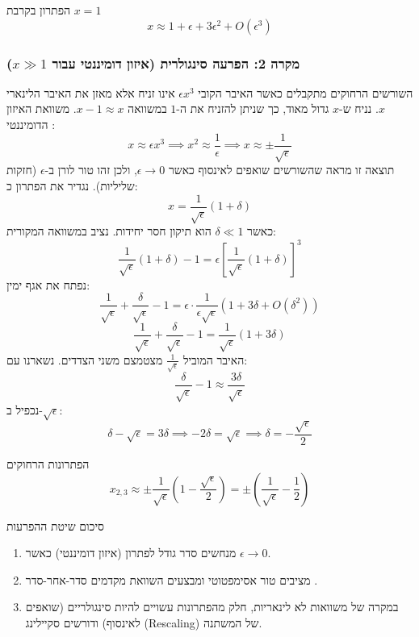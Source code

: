 \begin{resultbox}{הפתרון בקרבת $x=1$}
\[
x \approx 1 + \epsilon + 3\epsilon^2 + O(\epsilon^3)
\]
\end{resultbox}

\subsubsection{מקרה 2: הפרעה סינגולרית (איזון דומיננטי עבור $x \gg 1$)}
השורשים הרחוקים מתקבלים כאשר האיבר הקובי $\epsilon x^3$ אינו זניח אלא מאזן את האיבר הלינארי $x$.
נניח ש-$x$ גדול מאוד, כך שניתן להזניח את ה-$1$ במשוואה $x - 1 \approx x$.
משוואת האיזון הדומיננטי :
\[
x \approx \epsilon x^3 \implies x^2 \approx \frac{1}{\epsilon} \implies x \approx \pm \frac{1}{\sqrt{\epsilon}}
\]
תוצאה זו מראה שהשורשים שואפים לאינסוף כאשר $\epsilon \to 0$, ולכן זהו טור לורן ב-$\epsilon$ (חזקות שליליות). נגדיר את הפתרון כ:
\[
x = \frac{1}{\sqrt{\epsilon}}(1 + \delta)
\]
כאשר $\delta \ll 1$ הוא תיקון חסר יחידות. נציב במשוואה המקורית:
\[
\frac{1}{\sqrt{\epsilon}}(1+\delta) - 1 = \epsilon \left[ \frac{1}{\sqrt{\epsilon}}(1+\delta) \right]^3
\]
נפתח את אגף ימין:
\[
\frac{1}{\sqrt{\epsilon}} + \frac{\delta}{\sqrt{\epsilon}} - 1 = \epsilon \cdot \frac{1}{\epsilon\sqrt{\epsilon}} (1 + 3\delta + O(\delta^2))
\]
\[
\frac{1}{\sqrt{\epsilon}} + \frac{\delta}{\sqrt{\epsilon}} - 1 = \frac{1}{\sqrt{\epsilon}} (1 + 3\delta)
\]
האיבר המוביל $\frac{1}{\sqrt{\epsilon}}$ מצטמצם משני הצדדים. נשארנו עם:
\[
\frac{\delta}{\sqrt{\epsilon}} - 1 \approx \frac{3\delta}{\sqrt{\epsilon}}
\]
נכפיל ב-$\sqrt{\epsilon}$:
\[
\delta - \sqrt{\epsilon} = 3\delta \implies -2\delta = \sqrt{\epsilon} \implies \delta = -\frac{\sqrt{\epsilon}}{2}
\]

\begin{resultbox}{הפתרונות הרחוקים}
\[
x_{2,3} \approx \pm \frac{1}{\sqrt{\epsilon}} \left( 1 - \frac{\sqrt{\epsilon}}{2} \right) = \pm \left( \frac{1}{\sqrt{\epsilon}} - \frac{1}{2} \right)
\]
\end{resultbox}

\begin{notebox}{סיכום שיטת ההפרעות}
\begin{enumerate}
    \item מנחשים סדר גודל לפתרון (איזון דומיננטי) כאשר $\epsilon \to 0$.
    \item מציבים טור אסימפטוטי ומבצעים השוואת מקדמים סדר-אחר-סדר .
    \item במקרה של משוואות לא לינאריות, חלק מהפתרונות עשויים להיות סינגולריים (שואפים לאינסוף) ודורשים סקיילינג (Rescaling) של המשתנה.
\end{enumerate}
\end{notebox}



